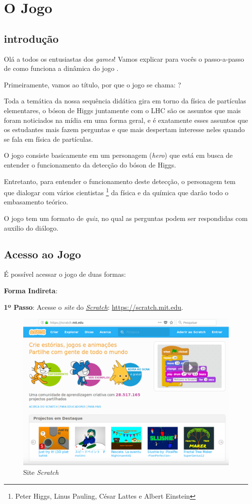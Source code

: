\documentclass[12pt,fleqn]{book} %
\begin{document}
\chapter{O Jogo }
\section{introdução}

Olá a todos os entusiastas dos \textit{games}! Vamos explicar para vocês o passo-a-passo de como funciona a dinâmica do jogo .

Primeiramente, vamos ao título, por que o jogo se chama: ? 

Toda a temática da nossa sequência didática gira em torno da física de partículas elementares, o bóson de Higgs juntamente com o LHC são os assuntos que mais foram noticiados na mídia em uma forma geral, e é exatamente esses assuntos que os estudantes mais fazem perguntas e que mais despertam interesse neles quando se fala em física de partículas.

O jogo consiste basicamente em um personagem (\textit{hero}) que está em busca de entender o funcionamento da detecção do bóson de Higgs.

Entretanto, para entender o funcionamento deste detecção, o personagem tem que dialogar com vários cientistas \footnote{Peter Higgs, Linus Pauling, César Lattes e Albert Einstein} da física e da química que darão todo o embasamento teórico.

O jogo tem um formato de \textit{quiz}, no qual as perguntas podem ser respondidas com auxilio do diálogo.

\section{Acesso ao Jogo}

É possível acessar o jogo de duas formas: 

\textbf{Forma Indireta}:

\textbf{1º Passo}: Acesse o \textit{site} do \href{https://scratch.mit.edu}{\textit{Scratch}}: \url{https://scratch.mit.edu}.

\begin{figure}[ht]
	\centering
	\includegraphics[width=0.7 \textwidth]{Produto/site_scratch}
	\caption{Site \textit{Scratch}}
	\label{fig:app_a:sitescratch}
\end{figure}
\end{document}

